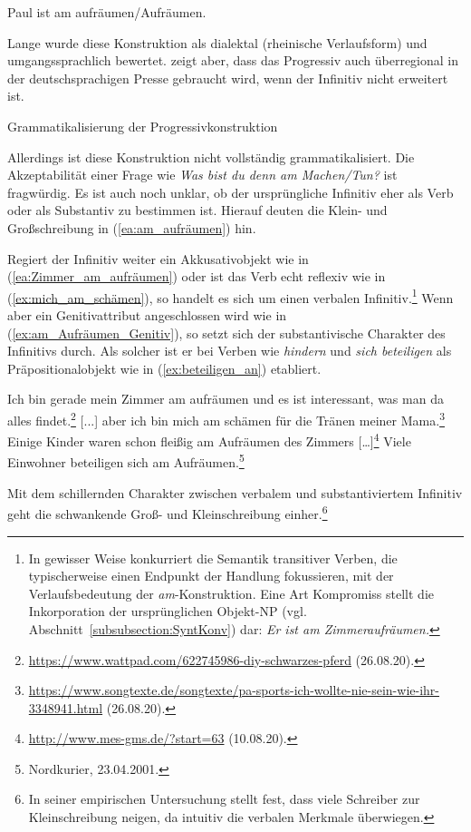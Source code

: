 \ea \label{ea:am_aufräumen} Paul ist am aufräumen/Aufräumen.
\z 

Lange wurde diese Konstruktion als dialektal (rheinische Verlaufsform) und umgangssprachlich bewertet. \citet[216--219]{VanPottelberge2004} zeigt aber, dass das Progressiv auch überregional in der deutschsprachigen Presse gebraucht wird, wenn der Infinitiv nicht erweitert ist.

\begin{Exkurs}{Grammatikalisierung der Progressivkonstruktion}\label{exkurs:Grammatikalisierung am-Konstruktion}

Allerdings ist diese Konstruktion nicht vollständig grammatikalisiert. Die Akzeptabilität einer Frage wie \textit{Was bist du denn am Machen/Tun?} ist fragwürdig. Es ist auch noch unklar, ob der ursprüngliche Infinitiv eher als Verb oder als Substantiv zu bestimmen ist. Hierauf deuten die Klein- und Großschreibung in (\ref{ea:am_aufräumen}) hin.

Regiert der Infinitiv weiter ein Akkusativobjekt wie in (\ref{ea:Zimmer_am_aufräumen}) oder ist das Verb echt reflexiv wie in (\ref{ex:mich_am_schämen}), so handelt es sich um einen verbalen Infinitiv.\footnote{In gewisser Weise konkurriert die Semantik transitiver Verben, die typischerweise einen Endpunkt der Handlung fokussieren, mit der Verlaufsbedeutung der \textit{am}-Konstruktion. Eine Art Kompromiss stellt die Inkorporation der ursprünglichen Objekt-NP (vgl. Abschnitt~\ref{subsubsection:SyntKonv}) dar: \textit{Er ist am Zimmeraufräumen.}} Wenn aber ein Genitivattribut angeschlossen wird wie in (\ref{ex:am_Aufräumen_Genitiv}), so setzt sich der substantivische Charakter des Infinitivs durch. Als solcher ist er bei Verben wie \textit{hindern} und \textit{sich beteiligen} als Präpositionalobjekt wie in (\ref{ex:beteiligen_an}) etabliert.

\ea \label{ea:Progressiv_Verb_Substantiv}
\ea \label{ea:Zimmer_am_aufräumen} Ich bin gerade mein Zimmer am aufräumen und es ist interessant, was man da alles findet.\footnote{\url{https://www.wattpad.com/622745986-diy-schwarzes-pferd} (26.08.20).}
\ex \label{ex:mich_am_schämen} [...] aber ich bin mich am schämen für die Tränen meiner Mama.\footnote{\url{https://www.songtexte.de/songtexte/pa-sports-ich-wollte-nie-sein-wie-ihr-3348941.html} (26.08.20).}
\ex \label{ex:am_Aufräumen_Genitiv} Einige Kinder waren schon fleißig am Aufräumen des Zimmers [\ldots{}]\footnote{\url{http://www.mes-gms.de/?start=63} (10.08.20).}
\ex \label{ex:beteiligen_an} Viele Einwohner beteiligen sich am Aufräumen.\footnote{Nordkurier, 23.04.2001.}
\z 
\z 

Mit dem schillernden Charakter zwischen verbalem und substantiviertem Infinitiv geht die schwankende Groß- und Kleinschreibung einher.\footnote{In seiner empirischen Untersuchung stellt \citet[70--71]{Krause2002} fest, dass viele Schreiber zur Kleinschreibung neigen, da intuitiv die verbalen Merkmale überwiegen.}

\end{Exkurs}


